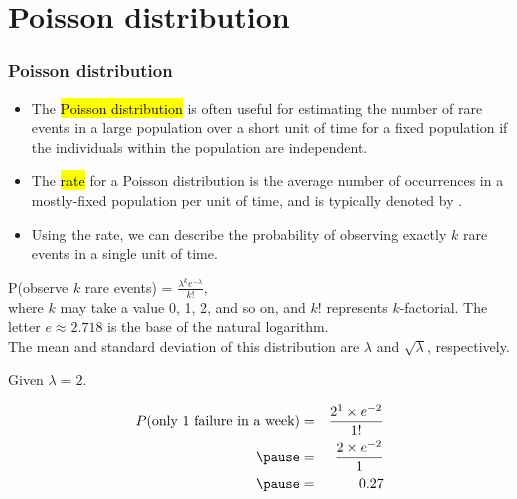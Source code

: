 
\section{Poisson distribution}


\begin{frame}
\frametitle{Poisson distribution}

\begin{itemize}

\item The \hl{Poisson distribution} is often useful for estimating the number of rare events in a large population over a short unit of time for a fixed population if the individuals within the population are independent.

\item The \hl{rate} for a Poisson distribution is the average number of occurrences in a mostly-fixed population per unit of time, and is typically denoted by \mathhl{\lambda}.

\item Using the rate, we can describe the probability of observing exactly $k$ rare events in a single unit of time.

\end{itemize}

\vfill

{
P(observe $k$ rare events) = $\frac{\lambda^k e^{-\lambda}}{k!}$, \\
where $k$ may take a value 0, 1, 2, and so on, and $k!$ represents $k$-factorial. The letter $e \approx 2.718$ is the base of the natural logarithm. \\

The mean and standard deviation of this distribution are $\lambda$ and $\sqrt{\lambda}$, respectively.
}

\end{frame}


\begin{frame}


\pause

Given $\lambda = 2$.

\pause

\begin{eqnarray*}
P(\text{only 1 failure in a week}) &=& \frac{2^1 \times e^{-2}}{1!} \\
\pause
&=& \frac{2 \times e^{-2}}{1} \\
\pause
&=& 0.27
\end{eqnarray*}

\end{frame}

